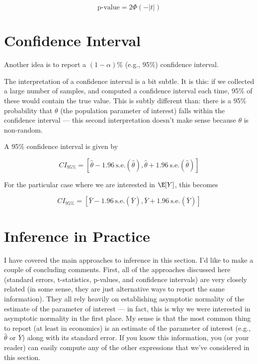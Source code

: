 \documentclass[
  letterpaper,
  DIV=11,
  numbers=noendperiod]{scrreprt}
\begin{document}
\[
  \textrm{p-value} = 2 \Phi(-|t|)
\]

\section{Confidence Interval}\label{confidence-interval}

Another idea is to report a \((1-\alpha)\%\) (e.g., 95\%) confidence
interval.

The interpretation of a confidence interval is a bit subtle. It is this:
if we collected a large number of samples, and computed a confidence
interval each time, 95\% of these would contain the true value. This is
subtly different than: there is a 95\% probability that \(\theta\) (the
population parameter of interest) falls within the confidence interval
--- this second interpretation doesn't make sense because \(\theta\) is
non-random.

A 95\% confidence interval is given by

\[
  CI_{95\%} = \left[\hat{\theta} - 1.96 \ \textrm{s.e.}(\hat{\theta}), \hat{\theta} + 1.96 \  \textrm{s.e.}(\hat{\theta})\right]
\]

For the particular case where we are interested in \(\E[Y]\), this
becomes

\[
  CI_{95\%} = \left[ \bar{Y} - 1.96 \ \textrm{s.e.}(\bar{Y}), \bar{Y} + 1.96 \ \textrm{s.e.}(\bar{Y}) \right]
\]

\section{Inference in Practice}\label{inference-in-practice}

I have covered the main approaches to inference in this section. I'd
like to make a couple of concluding comments. First, all of the
approaches discussed here (standard errors, t-statistics, p-values, and
confidence intervals) are very closely related (in some sense, they are
just alternative ways to report the same information). They all rely
heavily on establishing asymptotic normality of the estimate of the
parameter of interest --- in fact, this is why we were interested in
asymptotic normality in the first place. My sense is that the most
common thing to report (at least in economics) is an estimate of the
parameter of interest (e.g., \(\hat{\theta}\) or \(\bar{Y}\)) along with
its standard error. If you know this information, you (or your reader)
can easily compute any of the other expressions that we've considered in
this section.
\end{document}
